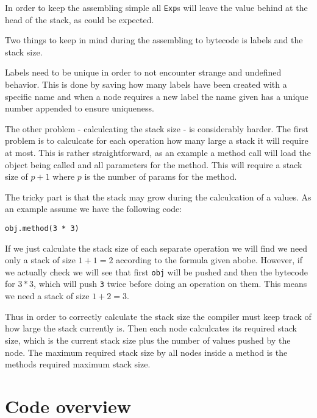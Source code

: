 \documentclass[a4paper]{article}
\begin{document}
In order to keep the assembling simple all \texttt{Exp}s will leave the value behind at the head
of the stack, as could be expected.

Two things to keep in mind during the assembling to bytecode is labels and the stack size.

Labels need to be unique in order to not encounter strange and undefined behavior. This is done
by saving how many labels have been created with a specific name and when
a node requires a new label the name given has a unique number appended to ensure uniqueness.

The other problem - calculcating the stack size - is considerably harder. The first problem
is to calculcate for each operation how many large a stack it will require at most. This is
rather straightforward, as an example a method call will load the object being called
and all parameters for the method. This will require a stack size of $p + 1$ where $p$
is the number of params for the method.

The tricky part is that the stack may grow during the calculcation of a values. As an example
assume we have the following code:

\begin{lstlisting}
obj.method(3 * 3)
\end{lstlisting}

If we just calculate the stack size of each separate operation we will find we need only
a stack of size $1 + 1 = 2$ according to the formula given abobe. However, if we actually
check we will see that first \texttt{obj} will be pushed and then the bytecode for $3 * 3$,
which will push \texttt{3} twice before doing an operation on them. This means we need a
stack of size $1+2 = 3$.

Thus in order to correctly calculate the stack size the compiler must keep track of how
large the stack currently is. Then each node calculcates its required stack size, which is
the current stack size plus the number of values pushed by the node. The maximum required
stack size by all nodes inside a method is the methods required maximum stack size.

\section{Code overview}
\end{document}
